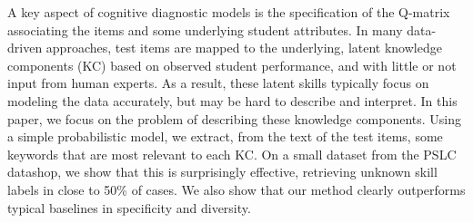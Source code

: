 A key aspect of cognitive diagnostic models is the specification of the Q-matrix associating the items and some underlying student attributes. In many data-driven approaches, test items are mapped to the underlying, latent knowledge components (KC) based on observed student performance, and with little or not input from human experts. As a result, these latent skills typically focus on modeling the data accurately, but may be hard to describe and interpret. In this paper, we focus on the problem of describing these knowledge components. Using a simple probabilistic model, we extract, from the text of the test items, some keywords that are most relevant to each KC. On a small dataset from the PSLC datashop, we show that this is surprisingly effective, retrieving unknown skill labels in close to 50\% of cases. We also show that our method clearly outperforms typical baselines in specificity and diversity.
